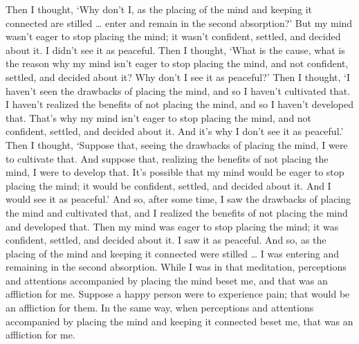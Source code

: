 \documentclass[12pt,openany]{book}%
\begin{document}
Then I thought, ‘Why don’t I, as the placing of the mind and keeping it connected are stilled … enter and remain in the second absorption?’ But my mind wasn’t eager to stop placing the mind; it wasn’t confident, settled, and decided about it. I didn’t see it as peaceful. Then I thought, ‘What is the cause, what is the reason why my mind isn’t eager to stop placing the mind, and not confident, settled, and decided about it? Why don’t I see it as peaceful?’ Then I thought, ‘I haven’t seen the drawbacks of placing the mind, and so I haven’t cultivated that. I haven’t realized the benefits of not placing the mind, and so I haven’t developed that. That’s why my mind isn’t eager to stop placing the mind, and not confident, settled, and decided about it. And it’s why I don’t see it as peaceful.’ Then I thought, ‘Suppose that, seeing the drawbacks of placing the mind, I were to cultivate that. And suppose that, realizing the benefits of not placing the mind, I were to develop that. It’s possible that my mind would be eager to stop placing the mind; it would be confident, settled, and decided about it. And I would see it as peaceful.’ And so, after some time, I saw the drawbacks of placing the mind and cultivated that, and I realized the benefits of not placing the mind and developed that. Then my mind was eager to stop placing the mind; it was confident, settled, and decided about it. I saw it as peaceful. And so, as the placing of the mind and keeping it connected were stilled … I was entering and remaining in the second absorption. While I was in that meditation, perceptions and attentions accompanied by placing the mind beset me, and that was an affliction for me. Suppose a happy person were to experience pain; that would be an affliction for them. In the same way, when perceptions and attentions accompanied by placing the mind and keeping it connected beset me, that was an affliction for me. 
\end{document}
